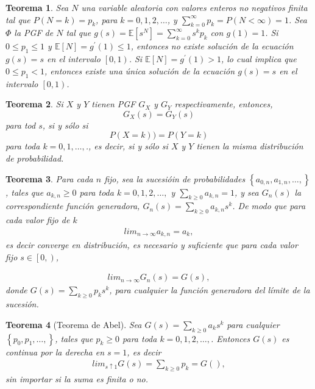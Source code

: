 \documentclass{article}
\newtheorem{Teo}{Teorema}
\newcommand{\esp}{\mathbb{E}}
\begin{document}
\begin{Teo}
Sea $N$ una variable aleatoria con valores enteros no negativos finita tal que $P\left(N=k\right)=p_{k}$, para $k=0,1,2,\ldots$, y $\sum_{k=0}^{\infty}p_{k}=P\left(N<\infty\right)=1$. Sea $\Phi$ la PGF de $N$ tal que
$g\left(s\right)=\esp\left[s^{N}\right]=\sum_{k=0}^{\infty}s^{k}p_{k}$ con $g\left(1\right)=1$. Si $0\leq p_{1}\leq1$ y $\esp\left[N\right]=g^{'}\left(1\right)\leq1$, entonces no existe soluci\'on  de la ecuaci\'on $g\left(s\right)=s$ en el intervalo $\left[0,1\right)$. Si $\esp\left[N\right]=g^{'}\left(1\right)>1$, lo cual implica que $0\leq p_{1}<1$, entonces existe una \'unica soluci\'on de la ecuaci\'on $g\left(s\right)=s$ en el intervalo $\left[0,1\right)$.
\end{Teo}


\begin{Teo}
Si $X$ y $Y$ tienen PGF $G_{X}$ y $G_{Y}$ respectivamente, entonces,\[G_{X}\left(s\right)=G_{Y}\left(s\right)\] para tod $s$, si y s\'olo si \[P\left(X=k\right))=P\left(Y=k\right)\] para toda $k=0,1,\ldots,$., es decir, si y s\'olo si $X$ y $Y$ tienen la misma distribuci\'on de probabilidad.
\end{Teo}


\begin{Teo}
Para cada $n$ fijo, sea la sucesi\'oin de probabilidades $\left\{a_{0,n},a_{1,n},\ldots,\right\}$, tales que $a_{k,n}\geq0$ para toda $k=0,1,2,\ldots,$ y $\sum_{k\geq0}a_{k,n}=1$, y sea $G_{n}\left(s\right)$ la correspondiente funci\'on generadora, $G_{n}\left(s\right)=\sum_{k\geq0}a_{k,n}s^{k}$. De modo que para cada valor fijo de $k$
\begin{eqnarray*}
lim_{n\rightarrow\infty}a_{k,n}=a_{k},
\end{eqnarray*}
es decir converge en distribuci\'on, es necesario y suficiente que para cada valor fijo $s\in\left[0,\right)$,

\begin{eqnarray*}
lim_{n\rightarrow\infty}G_{n}\left(s\right)=G\left(s\right),
\end{eqnarray*}
donde $G\left(s\right)=\sum_{k\geq0}p_{k}s^{k}$, para cualquier la funci\'on generadora del l\'imite de la sucesi\'on.
\end{Teo}

\begin{Teo}[Teorema de Abel]
Sea $G\left(s\right)=\sum_{k\geq0}a_{k}s^{k}$ para cualquier $\left\{p_{0},p_{1},\ldots,\right\}$, tales que $p_{k}\geq0$ para toda $k=0,1,2,\ldots,$. Entonces $G\left(s\right)$ es continua por la derecha en $s=1$, es decir
\begin{eqnarray*}
lim_{s\uparrow1}G\left(s\right)=\sum_{k\geq0}p_{k}=G\left(\right),
\end{eqnarray*}
sin importar si la suma es finita o no.
\end{Teo}
\end{document}
